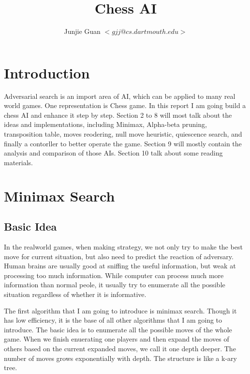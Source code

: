 \documentclass{article}
\title{Chess AI}
\author{Junjie Guan $<gjj@cs.dartmouth.edu>$}
\begin{document}
\maketitle

\tableofcontents

\section{Introduction}

Adversarial search is an import area of AI, which can be applied to many real world games. One representation is Chess game.  In this report I am going build a chess AI and enhance it step by step. Section 2 to 8 will most talk about the ideas and implementations, including Minimax, Alpha-beta pruning, transposition table, moves reodering, null move heuristic, quiescence search, and finally a contorller to better operate the game. Section 9 will mostly contain the analysis and comparison of those AIs. Section 10 talk about some reading materials. 













\clearpage
\section{Minimax Search}
\subsection{Basic Idea}
In the realworld games, when making strategy, we not only try to make the best move for current situation, but also need to predict the reaction of adversary. Human brains are usually good at sniffing the useful information, but weak at processing too much information. While computer can process much more information than normal peole, it usually try to enumerate all the possible situation regardless of whether it is informative.

The first algorithm that I am going to introduce is minimax search. Though it has low efficiency, it is  the base of all other algorithms that I am going to introduce. The basic idea is to enumerate all the possible moves of the whole game. When we finish enuerating one players and then expand the moves of others based on the current expanded moves, we call it one depth deeper. The number of moves grows exponentially with depth. The structure is like a k-ary tree.
\end{document}

